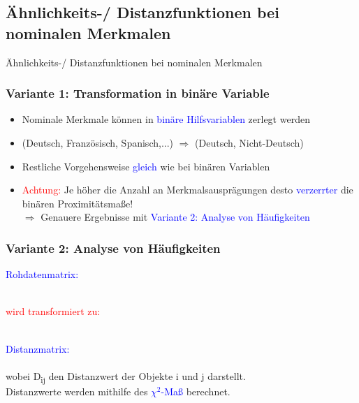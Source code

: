 \documentclass{beamer}
\begin{document}
\subsection{Ähnlichkeits-/ Distanzfunktionen bei nominalen Merkmalen}

\begin{frame}
 \centerline{Ähnlichkeits-/ Distanzfunktionen bei nominalen Merkmalen}
\end{frame}

\begin{frame}
 \frametitle{Variante 1: Transformation in binäre Variable}
 \begin{itemize}
  \item Nominale Merkmale können in \textcolor{blue}{binäre Hilfsvariablen} zerlegt werden
  \item (Deutsch, Französisch, Spanisch,...) $\Rightarrow$ (Deutsch, Nicht-Deutsch)
  \item Restliche Vorgehensweise \textcolor{blue}{gleich} wie bei binären Variablen
  \item \textcolor{red}{Achtung:} Je höher die Anzahl an Merkmalsausprägungen desto \textcolor{blue}{verzerrter} die binären Proximitätsmaße! \\
  $\Rightarrow$ Genauere Ergebnisse mit \textcolor{blue}{Variante 2: Analyse von Häufigkeiten}

 \end{itemize}
\end{frame}

\begin{frame}
 \frametitle{Variante 2: Analyse von Häufigkeiten}
 \textcolor{blue}{Rohdatenmatrix:}
  \\
 \ \\
 \centerline{\textcolor{red}{wird transformiert zu:}}
 \ \\
 \textcolor{blue}{Distanzmatrix:}
  \\
 \ \\
 wobei D\textsubscript{ij} den Distanzwert der Objekte i und j darstellt. \\
 Distanzwerte werden mithilfe des \textcolor{blue}{$\chi^2$-Maß} berechnet.
 
\end{frame}
\end{document}
